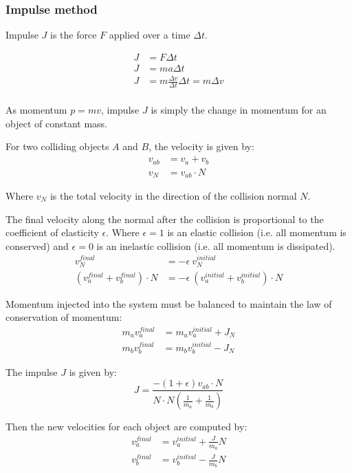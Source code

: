 \documentclass[a4paper]{article}
\begin{document}
\subsubsection{Impulse method}

Impulse $J$ is the force $F$ applied over a time $\Delta t$.

\begin{align*}
  J &= F \Delta t \\
  J &= ma \Delta t \tag*{$F = ma$} \\
  J &= m \frac{\Delta v}{\Delta t} \Delta t = m \Delta v
    \tag*{$a = \Delta v / \Delta t$} \\
\end{align*}

As momentum $p = mv$, impulse $J$ is simply the change in momentum for an object
of constant mass.

For two colliding objects $A$ and $B$, the velocity is given by:
\begin{align*}
  v_{ab} &= v_{a} + v_{b} \\
   v_{N} &= v_{ab} \cdot N
\end{align*}

Where $v_{N}$ is the total velocity in the direction of the collision normal
$N$.

The final velocity along the normal after the collision is proportional to the
coefficient of elasticity $\epsilon$. Where $\epsilon = 1$ is an elastic
collision (i.e. all momentum is conserved) and $\epsilon = 0$ is an inelastic
collision (i.e. all momentum is dissipated).
\begin{align*}
  v_{N}^{final} &= - \epsilon \: v_{N}^{initial} \\
  (v_{a}^{final} + v_{b}^{final}) \cdot N &=
    - \epsilon \: \left(v_{a}^{initial} + v_{b}^{initial}\right) \cdot N
\end{align*}

Momentum injected into the system must be balanced to maintain the law of
conservation of momentum:
\begin{align*}
  m_{a} v_{a}^{final} &= m_{a} v_{a}^{initial} + J_{N} \\
  m_{b} v_{b}^{final} &= m_{b} v_{b}^{initial} - J_{N}
\end{align*}

The impulse $J$ is given by:
\[
  J = \frac{-\left(1 + \epsilon \right) v_{ab} \cdot N}
           {N \cdot N \left(\frac{1}{m_{a}} + \frac{1}{m_{b}}\right)}
\]

Then the new velocities for each object are computed by:
\begin{align*}
  v_{a}^{final} &= v_{a}^{initial} + \frac{J}{m_{a}} N \\
  v_{b}^{final} &= v_{b}^{initial} - \frac{J}{m_{b}} N
\end{align*}
\end{document}
